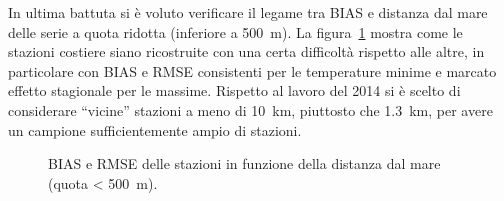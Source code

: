 In ultima battuta si è voluto verificare il legame tra BIAS e distanza dal mare delle serie a quota ridotta (inferiore a \qty{500}{\meter}). La figura~\ref{fig:sea-bias} mostra come le stazioni costiere siano ricostruite con una certa difficoltà rispetto alle altre, in particolare con BIAS e RMSE consistenti per le temperature minime e marcato effetto stagionale per le massime. Rispetto al lavoro del 2014 si è scelto di considerare ``vicine'' stazioni a meno di \qty{10}{\kilo\meter}, piuttosto che \qty{1.3}{\kilo\meter}, per avere un campione sufficientemente ampio di stazioni.

\begin{figure}[ht]
  \centering
  
  \caption{BIAS e RMSE delle stazioni in funzione della distanza dal mare (quota < \qty{500}{\meter}).}\label{fig:sea-bias}
\end{figure}

